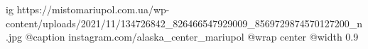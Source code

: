  
 
 
 
 

\ifcmt
  ig https://mistomariupol.com.ua/wp-content/uploads/2021/11/134726842_826466547929009_8569729874570127200_n.jpg
	@caption instagram.com/alaska_center_mariupol
  @wrap center
  @width 0.9
\fi
